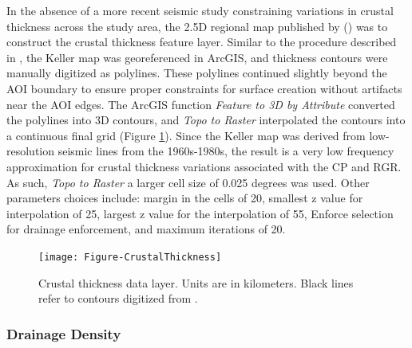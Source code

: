 In the absence of a more recent seismic study constraining variations in crustal thickness across the study area, the 2.5D regional map published by \citeauthor{keller_comparative_1991} (\citeyear{keller_comparative_1991}) was to construct the crustal thickness feature layer. Similar to the procedure described in \citep{pepin_new_2018}, the Keller map was georeferenced in ArcGIS, and thickness contours were manually digitized as polylines. These polylines continued slightly beyond the AOI boundary to ensure proper constraints for surface creation without artifacts near the AOI edges. The ArcGIS function \textit{Feature to 3D by Attribute} converted the polylines into 3D contours, and \textit{Topo to Raster} interpolated the contours into a continuous final grid (Figure \ref{fig:feat_crust}). Since the Keller map was derived from low-resolution seismic lines from the 1960s-1980s, the result is a very low frequency approximation for crustal thickness variations associated with the CP and RGR. As such, \textit{Topo to Raster} a larger cell size of 0.025 degrees was used. Other parameters choices include: margin in the cells of 20, smallest z value for interpolation of 25, largest z value for the interpolation of 55, Enforce selection for drainage enforcement, and maximum iterations of 20.

\begin{figure}[!htp]
\centering
\texttt{[image: Figure-CrustalThickness]}
\caption[Crustal thickness data layer]{Crustal thickness data layer. Units are in kilometers. Black lines refer to contours digitized from \protect\citep{keller_comparative_1991}.}
\label{fig:feat_crust}
\end{figure}

\subsubsection{Drainage Density}

